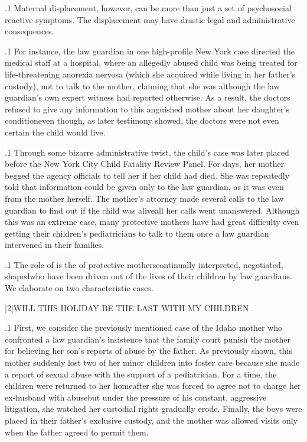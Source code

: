 \documentclass[11pt, twoside]{article}
\begin{document}
{\p.1{%
Maternal displacement, however, can be more than just a set of psychosocial reactive symptoms. The displacement may have drastic legal
and administrative consequences.
}%

\p.1{%
For instance, the law guardian in one high-profile New York case directed the medical staff at a hospital, where an allegedly abused child
was being treated for life-threatening anorexia nervosa (which she acquired while living in her father’s custody), not to talk to the mother,
claiming that she was  although the law guardian’s own
expert witness had reported otherwise. As a result, the doctors refused
to give any information to this anguished mother about her daughter’s
condition\mdash{}even though, as later testimony showed, the doctors were
not even certain the child would live.
}%

\p.1{%
Through some bizarre administrative twist, the child’s case was later
placed before the New York City Child Fatality Review Panel. For days,
her mother begged the agency officials to tell her if her child had died.
She was repeatedly told that information could be given only to the law
guardian, as it was  even from the mother herself. The
mother’s attorney made several calls to the law guardian to find out if
the child was alive\mdash{}all her calls went unanswered. Although this was
an extreme case, many protective mothers have had great difficulty even
getting their children’s pediatricians to talk to them once a law guardian
intervened in their families.
}%

\p.1{%
The role of  is the  of
protective mothers\mdash{}continually interpreted, negotiated, shaped\mdash{}who
have been driven out of the lives of their children by law guardians. We
elaborate on two characteristic cases.
}%


\s|2|{WILL THIS HOLIDAY BE THE LAST WITH MY CHILDREN\qm{}}

\p.1{%
\noindent{}First, we consider the previously mentioned case of the Idaho mother
who confronted a law guardian’s insistence that the family court punish
the mother for believing her son’s reports of abuse by the father. As previously shown, this mother suddenly lost two of her minor children into
foster care because she made a report of sexual abuse with the support of
a pediatrician. For a time, the children were returned to her home\mdash{}after
she was forced to agree not to charge her ex-husband with abuse\mdash{}but
under the pressure of his constant, aggressive litigation, she watched her
custodial rights gradually erode. Finally, the boys were placed in their
father’s exclusive custody, and the mother was allowed visits only when
the father agreed to permit them.
}%

}
\end{document}
